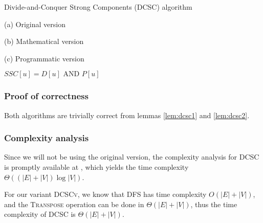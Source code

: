 \begin{algorithm}[H]
    \caption{Divide-and-Conquer Strong Components (DCSC) algorithm}
    \label{alg-dcsc}
    \begin{minipage}[t]{0.49\linewidth}
        (a) Original version
        \begin{algorithmic}[1]
                 
                 
                 
                \State {}
            \EndFunction
        \end{algorithmic}
    \end{minipage}
    \begin{minipage}[t]{0.49\linewidth}
        (b) Mathematical version
        \begin{algorithmic}[1]
                 
                 
                \State {}
            \EndFunction
        \end{algorithmic}
        (c) Programmatic version
        \begin{algorithmic}[1]
                 
                 
                 {$SSC[u] = D[u] \text{ AND } P[u]$}
                \EndFor
                \State {}
            \EndFunction
        \end{algorithmic}
    \end{minipage}
\end{algorithm}
\subsubsection{Proof of correctness}
Both algorithms are trivially correct from lemmas \ref{lem:dcsc1} and \ref{lem:dcsc2}.
\subsubsection{Complexity analysis}
Since we will not be using the original version, the complexity analysis for \textsc{DCSC} is promptly available at \cite{fleischer-dcsc}, which yields the time complexity $\Theta((|E|+|V|) \log |V|)$.\par
For our variant \textsc{DCSCv}, we know that \textsc{DFS} has time complexity $O(|E|+|V|)$, and the \textsc{Transpose} operation can be done in $\Theta(|E|+|V|)$, thus the time complexity of \textsc{DCSC} is $\Theta(|E|+|V|)$.
